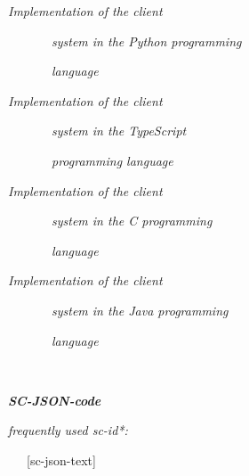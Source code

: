 \documentclass{article}
\begin{document}
\begin{multicols}{2}
\begin{description}[ labelwidth=0.75cm]
\begin{description}[ labelwidth=0.75cm]
\begin{description}[ labelwidth=0.75cm]
\item[= \ \ \ \ \{•] \textit{Implementation of the client}\par
 \ \ \ \ \ \ \  \textit{system in the Python programming}\par
\ \  \ \ \ \ \ \textit{language}\par

\item[ \ \ \ \ \ \ \ •] \textit{Implementation of the client}\par
 \ \ \ \ \ \ \  \textit{system in the TypeScript}\par
\ \  \ \ \ \ \ \textit{programming language}\par

\item[ \ \ \ \ \ \ \ •] \textit{Implementation of the client}\par
 \ \ \ \ \ \ \  \textit{system in the C programming}\par
\ \  \ \ \ \ \ \textit{language}\par

\item[ \ \ \ \ \ \ \ •] \textit{Implementation of the client}\par
 \ \ \ \ \ \ \  \textit{system in the Java programming}\par
\ \  \ \ \ \ \ \textit{language}\par

\item[ \ \ \ \ \ \ \}]
\item[\}]

\end{description}
\par \ \par 

 \noindent\textbf{\textit{SC-JSON-code}}

\begin{description}[ labelwidth=0.75cm]
\vspace{-0.2cm} 
 \item [:=] [Semantic JSON-code]

\item [:=] [Semantic JavaScript Object Notation code]

\item [:=] [Metalanguage for describing the representation
of messages between subsystems of the ostisplatform]

\item [$\Rightarrow$]  \textit{frequently used sc-id*:} \par
\ \ \ [sc-json-text]


\end{description}
\end{description}
\end{description}
\end{multicols}
\end{document}
